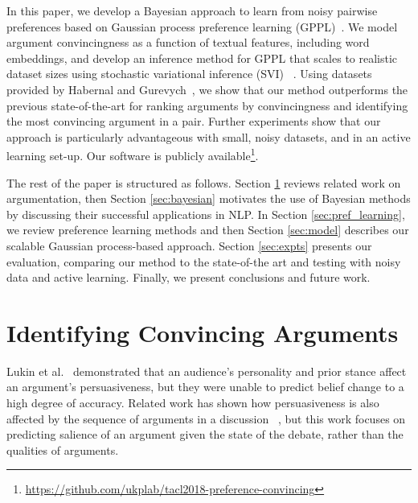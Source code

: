 In this paper, we develop a Bayesian approach to learn from noisy pairwise preferences
based on Gaussian process preference learning (GPPL)~\cite{chu2005preference}.
We model argument convincingness as a function of textual features, including word embeddings,
and develop an inference method for GPPL that scales to realistic dataset sizes using stochastic variational inference (SVI) ~\cite{hoffman2013stochastic}. %
Using datasets provided by Habernal and Gurevych~,
we show that our method outperforms the previous state-of-the-art for ranking arguments by convincingness 
and identifying the most convincing argument in a pair. 
Further experiments show that our approach is particularly advantageous with small, noisy datasets, 
and in an active learning set-up.
Our software is publicly available\footnote{\url{https://github.com/ukplab/tacl2018-preference-convincing}}.

The rest of the paper is structured as follows.
Section \ref{sec:related} reviews related work on argumentation,
then Section \ref{sec:bayesian} motivates the use of Bayesian methods by discussing their successful applications in NLP.
In Section \ref{sec:pref_learning}, we review preference learning methods and then Section \ref{sec:model}
describes our scalable Gaussian process-based approach.
Section \ref{sec:expts} presents our evaluation, 
comparing our method to the state-of-the art and testing with noisy data and active learning.
Finally, we present conclusions and future work.

\section{Identifying Convincing Arguments}\label{sec:related}

Lukin et al.~ demonstrated that an audience's personality and prior stance affect
an argument's persuasiveness, but they were unable to predict belief change to a high degree of accuracy.
Related work has shown how persuasiveness is also affected by the sequence of arguments in a discussion 
~\cite{tan2016winning,rosenfeld2016providing,monteserin2013reinforcement},
but this work focuses on predicting salience of an argument given the state of the debate,
 rather than the qualities of arguments.

